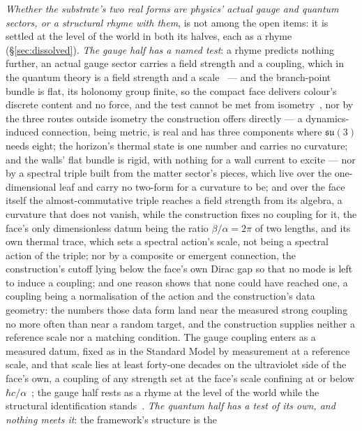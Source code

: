 \documentclass[11pt,a4paper]{article}
\theoremstyle{plain}
\theoremstyle{definition}
\begin{document}
\emph{Whether the substrate's two real forms are physics' actual gauge and quantum sectors, or a structural
rhyme with them}, is not among the open items: it is settled at the level of the world in both its halves, each as
a rhyme (\S\ref{sec:dissolved}). \emph{The
gauge half has a named test}: a rhyme predicts nothing further, an actual gauge sector carries a field strength
and a coupling, which in the quantum theory is a field strength and a scale~\cite{JanzenMatter} --- and the branch-point bundle is flat, its holonomy group finite, so the compact face delivers
colour's discrete content and no force, and the test cannot be met from isometry~\cite{JanzenBoundary,
JanzenMatter}, nor by the three routes outside isometry the construction offers directly --- a dynamics-induced
connection, being metric, is real and has three components where $\mathfrak{su}(3)$ needs eight; the horizon's thermal
state is one number and carries no curvature; and the walls' flat bundle is rigid, with nothing for a wall
current to excite --- nor by a spectral triple built from the matter sector's pieces, which live over the one-dimensional leaf and carry no two-form for a curvature to be; and over the face itself the almost-commutative triple reaches a field strength from its algebra, a curvature that does not vanish, while the construction fixes no coupling for it, the face's only dimensionless datum being the ratio $\beta/\alpha=2\pi$ of two lengths, and its own thermal trace, which sets a spectral action's scale, not being a spectral action of the triple; nor by a composite or emergent connection, the construction's cutoff lying below the face's own Dirac gap so that no mode is left to induce a coupling; and one reason shows that none could have reached one, a coupling being a normalisation of the action and the construction's data geometry: the numbers those data form land near the measured strong coupling no more often than near a random target, and the construction supplies neither a reference scale nor a matching condition. The gauge coupling enters as a measured datum, fixed as in the Standard Model by measurement at a reference scale, and that scale lies at least forty-one decades on the ultraviolet side of the face's own, a coupling of any strength set at the face's scale confining at or below $\hbar c/\alpha$~\cite{JanzenBoundary,JanzenMatter}; the gauge half rests as a rhyme at the level of the world while the structural identification stands~\cite{JanzenBoundary}. \emph{The quantum half has a test of its own, and nothing meets it}: the framework's structure is the
\end{document}
